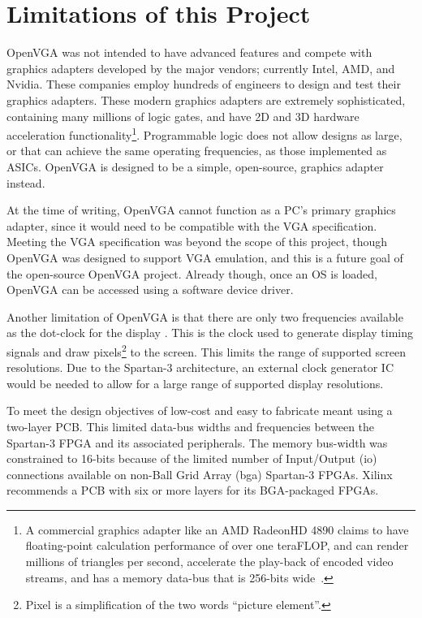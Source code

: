 \section{Limitations of this Project}
OpenVGA was not intended to have advanced features and compete with graphics
adapters developed by the major vendors; currently Intel, AMD, and Nvidia. These
companies employ hundreds of engineers to design and test their graphics
adapters. These modern graphics adapters are extremely sophisticated, containing
many millions of logic gates, and have 2D and 3D hardware acceleration
functionality\footnote{A commercial graphics adapter like an AMD
Radeon\texttrademark HD 4890 claims to have floating-point calculation
performance of over one teraFLOP, and can render millions of triangles per
second, accelerate the play-back of encoded video streams, and has a memory
data-bus that is 256-bits wide~\cite{AMD_4890}.}. Programmable logic does not
allow designs as large, or that can achieve the same operating frequencies, as
those implemented as ASICs. OpenVGA is designed to be a simple, open-source,
graphics adapter instead.

At the time of writing, OpenVGA cannot function as a PC's primary graphics
adapter, since it would need to be compatible with the VGA specification. Meeting
the VGA specification was beyond the scope of this project, though OpenVGA was
designed to support VGA emulation, and this is a future goal of the open-source
OpenVGA project. Already though, once an OS is loaded, OpenVGA can be accessed
using a software device driver.

Another limitation of OpenVGA is that there are only two frequencies available as
the dot-clock for the display . This is the clock used to generate display timing
signals and draw \gls{pixel}s\footnote{Pixel is a simplification of the two words
``picture element''.} to the screen. This limits the range of supported
screen resolutions. Due to the Spartan-3 architecture, an external clock
generator IC would be needed to allow for a large range of supported display
resolutions.

To meet the design objectives of low-cost and easy to fabricate meant using a
two-layer PCB. This limited data-bus widths and frequencies between the Spartan-3
FPGA and its associated peripherals. The memory bus-width was constrained to
16-bits because of the limited number of Input/Output (\gls{io}) connections
available on non-Ball Grid Array (\gls{bga}) Spartan-3 FPGAs.
Xilinx recommends a PCB with six or more layers for its BGA-packaged FPGAs.

